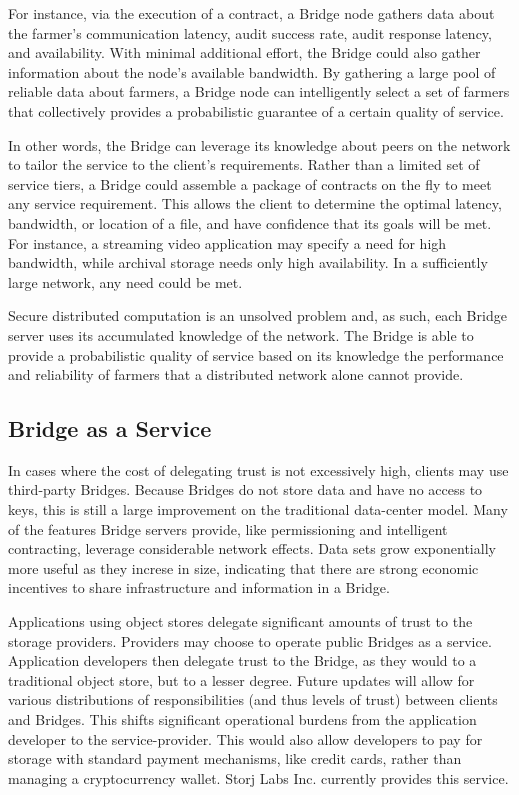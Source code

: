 \documentclass[a4paper,10pt]{article}
\begin{document}
For instance, via the execution of a contract, a Bridge node gathers data about the farmer’s communication latency, audit success rate, audit response latency, and availability. With minimal additional effort, the Bridge could also gather information about the node’s available bandwidth. By gathering a large pool of reliable data about farmers, a Bridge node can intelligently select a set of farmers that collectively provides a probabilistic guarantee of a certain quality of service.

In other words, the Bridge can leverage its knowledge about peers on the network to tailor the service to the client’s requirements. Rather than a limited set of service tiers, a Bridge could assemble a package of contracts on the fly to meet any service requirement. This allows the client to determine the optimal latency, bandwidth, or location of a file, and have confidence that its goals will be met. For instance, a streaming video application may specify a need for high bandwidth, while archival storage needs only high availability. In a sufficiently large network, any need could be met.

Secure distributed computation is an unsolved problem and, as such, each Bridge server uses its accumulated knowledge of the network. The Bridge is able to provide a probabilistic quality of service based on its knowledge the performance and reliability of farmers that a distributed network alone cannot provide.

\subsection{Bridge as a Service}
In cases where the cost of delegating trust is not excessively high, clients may use third-party Bridges. Because Bridges do not store data and have no access to keys, this is still a large improvement on the traditional data-center model. Many of the features Bridge servers provide, like permissioning and intelligent contracting, leverage considerable network effects. Data sets grow exponentially more useful as they increse in size, indicating that there are strong economic incentives to share infrastructure and information in a Bridge.

Applications using object stores delegate significant amounts of trust to the storage providers. Providers may choose to operate public Bridges as a service. Application developers then delegate trust to the Bridge, as they would to a traditional object store, but to a lesser degree. Future updates will allow for various distributions of responsibilities (and thus levels of trust) between clients and Bridges. This shifts significant operational burdens from the application developer to the service-provider. This would also allow developers to pay for storage with standard payment mechanisms, like credit cards, rather than managing a cryptocurrency wallet. Storj Labs Inc. currently provides this service.
\end{document}
